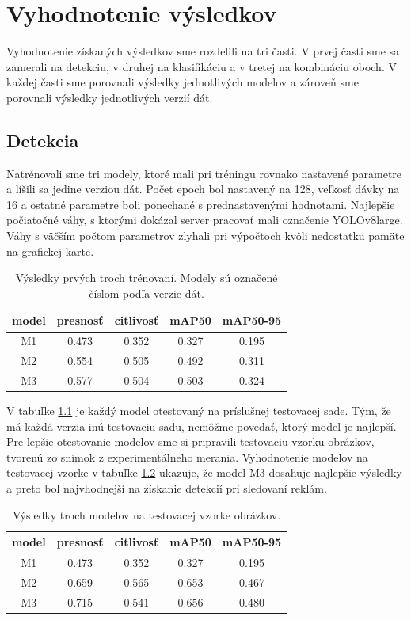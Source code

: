 \chapter{Vyhodnotenie výsledkov}\label{chap:results}

Vyhodnotenie získaných výsledkov sme rozdelili na tri časti. V prvej časti sme sa zamerali na detekciu, v druhej na klasifikáciu a v tretej na kombináciu oboch. V každej časti sme porovnali výsledky jednotlivých modelov a zároveň sme porovnali výsledky jednotlivých verzií dát.

\section{Detekcia}

Natrénovali sme tri modely, ktoré mali pri tréningu rovnako nastavené parametre a líšili sa jedine verziou dát. Počet epoch bol nastavený na 128, veľkosť dávky na 16 a ostatné parametre boli ponechané s prednastavenými hodnotami. Najlepšie počiatočné váhy, s ktorými dokázal server pracovať mali označenie YOLOv8large. Váhy s väčším počtom parametrov zlyhali pri výpočtoch kvôli nedostatku pamäte na grafickej karte.
\\
\begin{table}[ht]
\centering
\begin{tabular}{ |c c c c c| }
\hline
model & presnosť & citlivosť & mAP50 & mAP50-95 \\
\hline
M1  & 0.473 & 0.352	& 0.327	& 0.195 \\
M2  & 0.554	& 0.505	& 0.492	& 0.311 \\
M3  & 0.577	& 0.504	& 0.503	& 0.324 \\
\hline
\end{tabular}
\caption{Výsledky prvých troch trénovaní. Modely sú označené číslom podľa verzie dát.}
\label{table:test1}
\end{table}

V tabuľke \ref{table:test1} je každý model otestovaný na príslušnej testovacej sade. Tým, že má každá verzia inú testovaciu sadu, nemôžme povedať, ktorý model je najlepší. Pre lepšie otestovanie modelov sme si pripravili testovaciu vzorku obrázkov, tvorenú zo snímok z experimentálneho merania. Vyhodnotenie modelov na testovacej vzorke v tabuľke \ref{table:test2} ukazuje, že model M3 dosahuje najlepšie výsledky a preto bol najvhodnejší na získanie detekcií pri sledovaní reklám.
\\
\begin{table}[ht]
\centering
\begin{tabular}{ |c c c c c|  }
\hline
model & presnosť & citlivosť & mAP50 & mAP50-95 \\ 
\hline
M1  & 0.473	& 0.352	& 0.327	& 0.195 \\
M2  & 0.659 & 0.565 & 0.653 & 0.467 \\
M3  & 0.715 & 0.541 & 0.656 & 0.480 \\
\hline
\end{tabular}
\caption{Výsledky troch modelov na testovacej vzorke obrázkov.}
\label{table:test2}
\end{table}

